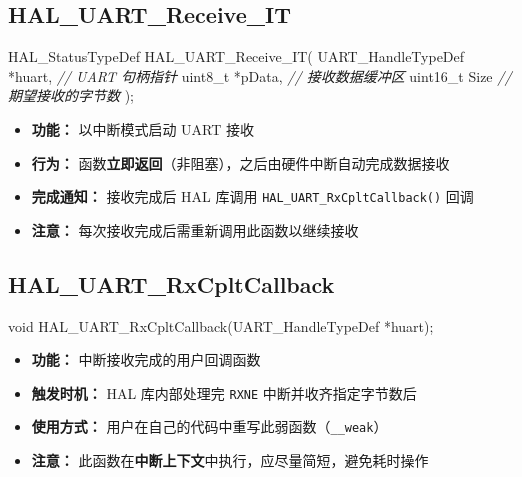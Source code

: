 \documentclass[
  chinese,
  UTF8,
  oneside,
  openany]{ctexbook}
\newenvironment{Shaded}{}{}
\newcommand{\CommentTok}[1]{\textcolor[rgb]{0.38,0.63,0.69}{\textit{#1}}}
\newcommand{\DataTypeTok}[1]{\textcolor[rgb]{0.56,0.13,0.00}{#1}}
\newcommand{\NormalTok}[1]{#1}
\newcommand{\OperatorTok}[1]{\textcolor[rgb]{0.40,0.40,0.40}{#1}}
\providecommand{\tightlist}{%
  \setlength{\itemsep}{0pt}\setlength{\parskip}{0pt}}
\begin{document}
\subsection{HAL\_UART\_Receive\_IT}\label{hal_uart_receive_it}

\begin{Shaded}
\begin{Highlighting}[]
\NormalTok{HAL\_StatusTypeDef HAL\_UART\_Receive\_IT}\OperatorTok{(}
\NormalTok{    UART\_HandleTypeDef }\OperatorTok{*}\NormalTok{huart}\OperatorTok{,}  \CommentTok{// UART 句柄指针}
    \DataTypeTok{uint8\_t}           \OperatorTok{*}\NormalTok{pData}\OperatorTok{,}   \CommentTok{// 接收数据缓冲区}
    \DataTypeTok{uint16\_t}\NormalTok{           Size     }\CommentTok{// 期望接收的字节数}
\OperatorTok{);}
\end{Highlighting}
\end{Shaded}

\begin{itemize}
\tightlist
\item
  \textbf{功能：} 以中断模式启动 UART 接收
\item
  \textbf{行为：}
  函数\textbf{立即返回}（非阻塞），之后由硬件中断自动完成数据接收
\item
  \textbf{完成通知：} 接收完成后 HAL 库调用
  \texttt{HAL\_UART\_RxCpltCallback()} 回调
\item
  \textbf{注意：} 每次接收完成后需重新调用此函数以继续接收
\end{itemize}

\subsection{HAL\_UART\_RxCpltCallback}\label{hal_uart_rxcpltcallback}

\begin{Shaded}
\begin{Highlighting}[]
\DataTypeTok{void}\NormalTok{ HAL\_UART\_RxCpltCallback}\OperatorTok{(}\NormalTok{UART\_HandleTypeDef }\OperatorTok{*}\NormalTok{huart}\OperatorTok{);}
\end{Highlighting}
\end{Shaded}

\begin{itemize}
\tightlist
\item
  \textbf{功能：} 中断接收完成的用户回调函数
\item
  \textbf{触发时机：} HAL 库内部处理完 \texttt{RXNE}
  中断并收齐指定字节数后
\item
  \textbf{使用方式：}
  用户在自己的代码中重写此弱函数（\texttt{\_\_weak}）
\item
  \textbf{注意：}
  此函数在\textbf{中断上下文}中执行，应尽量简短，避免耗时操作
\end{itemize}
\end{document}
